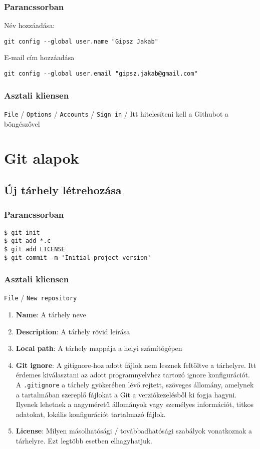 \documentclass{article}
\begin{document}
\subsubsection*{Parancssorban}

Név hozzáadása:
\begin{lstlisting}
git config --global user.name "Gipsz Jakab"
\end{lstlisting}

E-mail cím hozzáadása
\begin{lstlisting}
git config --global user.email "gipsz.jakab@gmail.com"
\end{lstlisting}

\subsubsection*{Asztali kliensen}

\texttt{File} / \texttt{Options} / \texttt{Accounts} / \texttt{Sign in} / Itt hitelesíteni kell a Githubot a böngészővel

\newpage
\section{Git alapok}
\subsection*{Új tárhely létrehozása}
\subsubsection*{Parancssorban}
\begin{lstlisting}
$ git init
$ git add *.c
$ git add LICENSE
$ git commit -m 'Initial project version'
\end{lstlisting}

\subsubsection*{Asztali kliensen}
\texttt{File} / \texttt{New repository}
\begin{enumerate}
\item \textbf{Name}: A tárhely neve
\item \textbf{Description}: A tárhely rövid leírása
\item \textbf{Local path}: A tárhely mappája a helyi számítógépen
\item \textbf{Git ignore}: A gitignore-hoz adott fájlok nem lesznek feltöltve a tárhelyre. Itt érdemes kiválasztani az adott programnyelvhez tartozó ignore konfigurációt. A \texttt{.gitignore} a tárhely gyökerében lévő rejtett, szöveges állomány, amelynek a tartalmában szereplő fájlokat a Git a verziókezelésből ki fogja hagyni. Ilyenek lehetnek a nagyméretű állományok vagy személyes információt, titkos adatokat, lokális konfigurációt tartalmazó fájlok.
\item \textbf{License}: Milyen másolhatósági / továbbadhatósági szabályok vonatkoznak a tárhelyre. Ezt legtöbb esetben elhagyhatjuk.
\end{enumerate}
\end{document}
